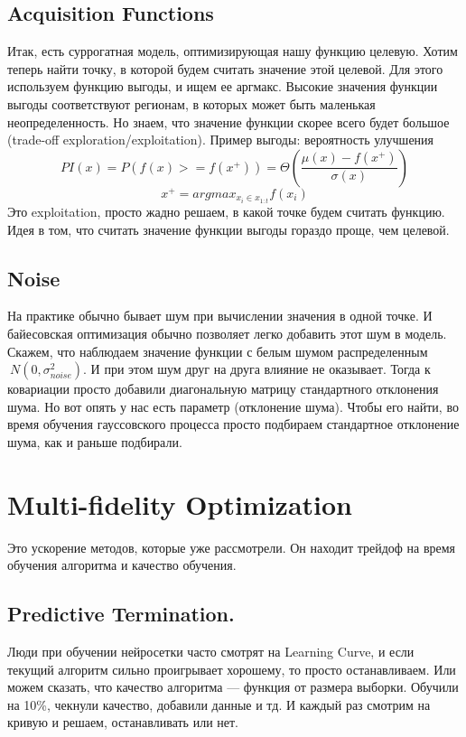 \subsection{Acquisition Functions}
Итак, есть суррогатная модель, оптимизирующая нашу функцию целевую. Хотим теперь найти точку, в которой будем считать значение этой целевой. Для этого используем функцию выгоды, и ищем ее аргмакс. Высокие значения функции выгоды соответствуют регионам, в которых может быть маленькая неопределенность. Но знаем, что значение функции скорее всего будет большое (trade-off exploration/exploitation). Пример выгоды: вероятность улучшения
$$PI(x) = P(f(x) >= f(x^+)) = \Theta(\frac{\mu(x) - f(x^+)}{\sigma(x)})$$
$$x^+=argmax_{x_i\in x_{1:t}}f(x_i)$$
Это exploitation, просто жадно решаем, в какой точке будем считать функцию. Идея в том, что считать значение функции выгоды гораздо проще, чем целевой. 

\subsection{Noise}
На практике обычно бывает шум при вычислении значения в одной точке. И байесовская оптимизация обычно позволяет легко добавить этот шум в модель. Скажем, что наблюдаем значение функции с белым шумом распределенным $~\textit{N}(0, \sigma_{noise}^2)$. И при этом шум друг на друга влияние не оказывает. Тогда к ковариации просто добавили диагональную матрицу стандартного отклонения шума. Но вот опять у нас есть параметр (отклонение шума). Чтобы его найти, во время обучения гауссовского процесса просто подбираем стандартное отклонение шума, как и раньше подбирали.

\section{Multi-fidelity Optimization}
Это ускорение методов, которые уже рассмотрели. Он находит трейдоф на время обучения алгоритма и качество обучения. 

\subsection{Predictive Termination.}
Люди при обучении нейросетки часто смотрят на Learning Curve, и если текущий алгоритм сильно проигрывает хорошему, то просто останавливаем. Или можем сказать, что качество алгоритма --- функция от размера выборки. Обучили на 10\%, чекнули качество, добавили данные и тд. И каждый раз смотрим на кривую и решаем, останавливать или нет.

